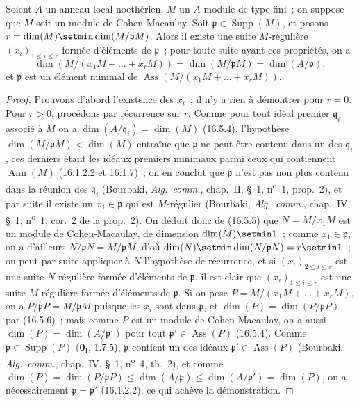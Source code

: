 \begin{proposition}[16.5.9]
\label{0.16.5.9-fr}
Soient $A$ un anneau local noethérien, $M$ un $A$-module de type fini~; on
suppose que $M$ soit un module de Cohen-Macaulay. Soit
$\mathfrak{p}\in\operatorname{Supp}(M)$, et posons
$r=\dim(M)\setmin\dim(M/\mathfrak{p}M)$. Alors il existe une suite $M$-régulière
$(x_i)_{1\leq i\leq r}$ formée d'éléments de $\mathfrak{p}$~; pour toute
suite ayant ces propriétés, on a
\[
  \dim(M/(x_1M+\ldots+x_rM))
  =\dim(M/\mathfrak{p}M)=\dim(A/\mathfrak{p}),
\]
et $\mathfrak{p}$ est un élément minimal de
$\operatorname{Ass}(M/(x_1M+\ldots+x_rM))$.
\end{proposition}

\begin{proof}
Prouvons d'abord l'existence des $x_i$~; il n'y a rien à démontrer pour
$r=0$. Pour $r>0$, procédons par récurrence sur $r$. Comme pour tout idéal
premier $\mathfrak{q}_i$ associé à $M$ on a
$\dim(A/\mathfrak{q}_i)=\dim(M)$ (16.5.4), l'hypothèse
$\dim(M/\mathfrak{p}M)<\dim(M)$ entraîne que $\mathfrak{p}$ ne peut être
contenu dans un des $\mathfrak{q}_i$, ces derniers étant les idéaux premiers
minimaux parmi ceux qui contiennent $\operatorname{Ann}(M)$ (16.1.2.2 et
16.1.7)~; on en conclut que $\mathfrak{p}$ n'est pas non plus contenu dans la
réunion des $\mathfrak{q}_i$ (Bourbaki, \emph{Alg.~comm.}, chap.~II, \S~1,
n\textsuperscript{o}~1, prop.~2), et par suite il existe un $x_1\in\mathfrak{p}$ qui est
$M$-régulier (Bourbaki, \emph{Alg.~comm.}, chap.~IV, \S~1, n\textsuperscript{o}~1, cor.~2 de
la prop.~2). On déduit donc de (16.5.5) que $N=M/x_1M$ est un module de
Cohen-Macaulay, de dimension $\dim(M)\setmin 1$~; comme $x_1\in\mathfrak{p}$, on a
d'ailleurs $N/\mathfrak{p}N=M/\mathfrak{p}M$, d'où
$\dim(N)\setmin\dim(N/\mathfrak{p}N)=r\setmin 1$~; on peut par suite appliquer à $N$
l'hypothèse de récurrence, et si $(x_i)_{2\leq i\leq r}$ est une suite
$N$-régulière formée d'éléments de $\mathfrak{p}$, il est clair que
$(x_i)_{1\leq i\leq r}$ est une suite $M$-régulière formée d'éléments de
$\mathfrak{p}$.
Si on pose $P=M/(x_1M+\ldots+x_rM)$, on a
$P/\mathfrak{p}P=M/\mathfrak{p}M$ puisque les $x_i$ sont dans
$\mathfrak{p}$, et $\dim(P)=\dim(P/\mathfrak{p}P)$ par (16.5.6)~; mais comme
$P$ est un module de Cohen-Macaulay, on a aussi
$\dim(P)=\dim(A/\mathfrak{p}')$ pour tout
$\mathfrak{p}'\in\operatorname{Ass}(P)$ (16.5.4). Comme
$\mathfrak{p}\in\operatorname{Supp}(P)$ ($\mathbf{0}_{\mathrm I}$, 1.7.5),
$\mathfrak{p}$ contient un des idéaux
$\mathfrak{p}'\in\operatorname{Ass}(P)$ (Bourbaki, \emph{Alg.~comm.},
chap.~IV, \S~1, n\textsuperscript{o}~4, th.~2), et comme
$\dim(P)=\dim(P/\mathfrak{p}P)
\leq\dim(A/\mathfrak{p})
\leq\dim(A/\mathfrak{p}')=\dim(P)$,
on a nécessairement $\mathfrak{p}=\mathfrak{p}'$ (16.1.2.2), ce qui achève
la démonstration.
\end{proof}

